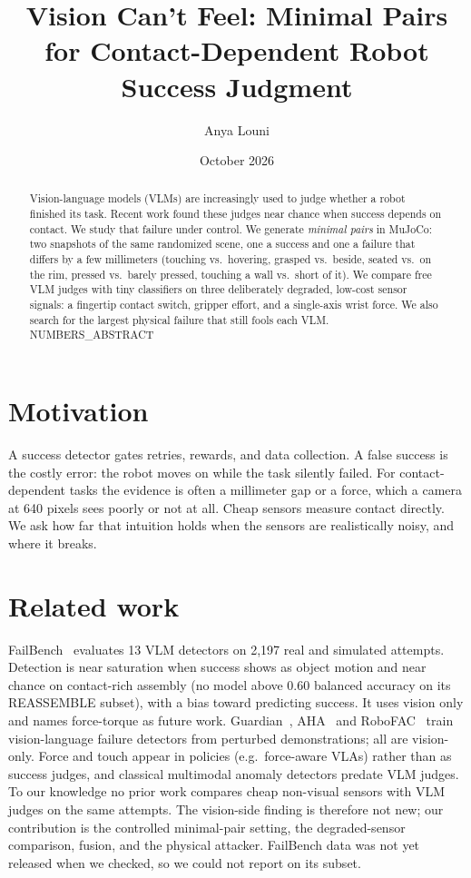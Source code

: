 \documentclass[10pt,twocolumn]{article}
\title{Vision Can't Feel: Minimal Pairs for Contact-Dependent Robot Success Judgment}
\author{Anya Louni}
\date{October 2026}
\begin{document}
\maketitle

\begin{abstract}
Vision-language models (VLMs) are increasingly used to judge whether a robot finished its task. Recent work found these judges near chance when success depends on contact. We study that failure under control. We generate \emph{minimal pairs} in MuJoCo: two snapshots of the same randomized scene, one a success and one a failure that differs by a few millimeters (touching vs.\ hovering, grasped vs.\ beside, seated vs.\ on the rim, pressed vs.\ barely pressed, touching a wall vs.\ short of it). We compare free VLM judges with tiny classifiers on three deliberately degraded, low-cost sensor signals: a fingertip contact switch, gripper effort, and a single-axis wrist force. We also search for the largest physical failure that still fools each VLM. NUMBERS\_ABSTRACT
\end{abstract}

\section{Motivation}
A success detector gates retries, rewards, and data collection. A false success is the costly error: the robot moves on while the task silently failed. For contact-dependent tasks the evidence is often a millimeter gap or a force, which a camera at 640 pixels sees poorly or not at all. Cheap sensors measure contact directly. We ask how far that intuition holds when the sensors are realistically noisy, and where it breaks.

\section{Related work}
FailBench~\cite{failbench} evaluates 13 VLM detectors on 2{,}197 real and simulated attempts. Detection is near saturation when success shows as object motion and near chance on contact-rich assembly (no model above 0.60 balanced accuracy on its REASSEMBLE subset), with a bias toward predicting success. It uses vision only and names force-torque as future work. Guardian~\cite{guardian}, AHA~\cite{aha} and RoboFAC~\cite{robofac} train vision-language failure detectors from perturbed demonstrations; all are vision-only. Force and touch appear in policies (e.g.\ force-aware VLAs) rather than as success judges, and classical multimodal anomaly detectors predate VLM judges. To our knowledge no prior work compares cheap non-visual sensors with VLM judges on the same attempts. The vision-side finding is therefore not new; our contribution is the controlled minimal-pair setting, the degraded-sensor comparison, fusion, and the physical attacker. FailBench data was not yet released when we checked, so we could not report on its subset.
\end{document}

